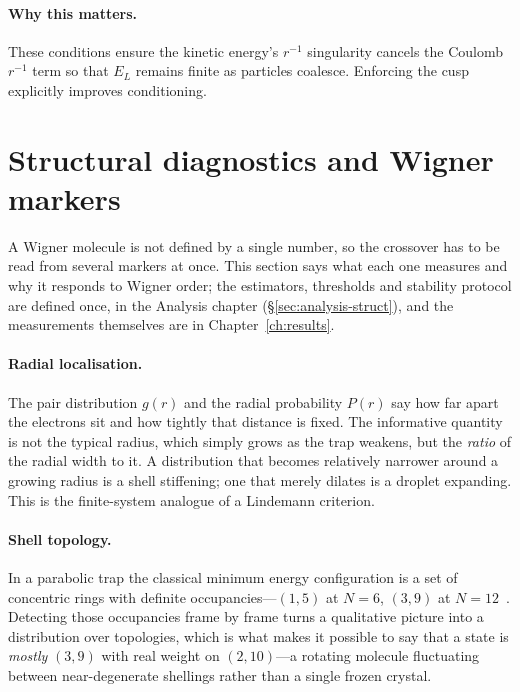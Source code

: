 \paragraph{Why this matters.}
These conditions ensure the kinetic energy’s $r^{-1}$ singularity cancels the Coulomb $r^{-1}$
term so that $E_L$ remains finite as particles coalesce. Enforcing the cusp explicitly improves conditioning.

\section{Structural diagnostics and Wigner markers}
\label{sec:wigner-markers-theory}

A Wigner molecule is not defined by a single number, so the crossover has to be read from
several markers at once. This section says what each one measures and why it responds to
Wigner order; the estimators, thresholds and stability protocol are defined once, in the
Analysis chapter (\S\ref{sec:analysis-struct}), and the measurements themselves are in
Chapter~\ref{ch:results}.

\paragraph{Radial localisation.} The pair distribution $g(r)$ and the radial probability
$P(r)$ say how far apart the electrons sit and how tightly that distance is fixed. The informative quantity is not the typical radius, which simply grows as the trap weakens, but
the \emph{ratio} of the radial width to it. A distribution that becomes relatively narrower
around a growing radius is a shell stiffening; one that merely dilates is a droplet
expanding. This is the finite-system analogue of a Lindemann criterion.

\paragraph{Shell topology.} In a parabolic trap the classical minimum energy configuration
is a set of concentric rings with definite occupancies---$(1,5)$ at $N{=}6$, $(3,9)$ at
$N{=}12$~\cite{schweigert1994spectralpropertieschargedparticles,Kong_2002}. Detecting those
occupancies frame by frame turns a qualitative picture into a distribution over topologies,
which is what makes it possible to say that a state is \emph{mostly} $(3,9)$ with real
weight on $(2,10)$---a rotating molecule fluctuating between near-degenerate shellings
rather than a single frozen crystal.

